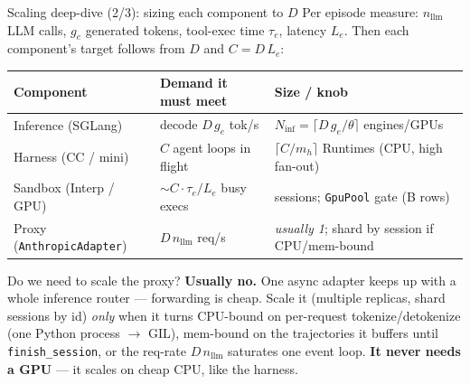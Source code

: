 \documentclass[aspectratio=169]{beamer}
\begin{document}
\begin{frame}{Scaling deep-dive (2/3): sizing each component to $D$}
  \footnotesize Per episode measure: $n_{\text{llm}}$ LLM calls, $g_e$ generated tokens, tool-exec
  time $\tau_e$, latency $L_e$. Then each component's target follows from $D$ and $C = D\,L_e$:
  \begin{center}
  \renewcommand{\arraystretch}{1.25}\scriptsize
  \begin{tabular}{lll}
    \toprule
    \textbf{Component} & \textbf{Demand it must meet} & \textbf{Size / knob} \\
    \midrule
    Inference (SGLang) & decode $D\,g_e$ tok/s & $N_{\text{inf}}=\lceil D\,g_e/\theta\rceil$ engines/GPUs \\
    Harness (CC / mini) & $C$ agent loops in flight & $\lceil C/m_h\rceil$ Runtimes (CPU, high fan-out) \\
    Sandbox (Interp / GPU) & $\sim C\cdot\tau_e/L_e$ busy execs & sessions; \texttt{GpuPool} gate (B rows) \\
    Proxy (\texttt{AnthropicAdapter}) & $D\,n_{\text{llm}}$ req/s & \emph{usually 1}; shard by session if CPU/mem-bound \\
    \bottomrule
  \end{tabular}
  \end{center}
  \vspace{0.3em}
  \begin{block}{\footnotesize Do we need to scale the proxy?}
    \footnotesize \textbf{Usually no.} One async adapter keeps up with a whole inference router ---
    forwarding is cheap. Scale it (multiple replicas, shard sessions by id) \emph{only} when it turns
    CPU-bound on per-request tokenize/detokenize (one Python process $\to$ GIL), mem-bound on the
    trajectories it buffers until \texttt{finish\_session}, or the req-rate $D\,n_{\text{llm}}$
    saturates one event loop. \textbf{It never needs a GPU} --- it scales on cheap CPU, like the harness.
  \end{block}
\end{frame}
\end{document}
